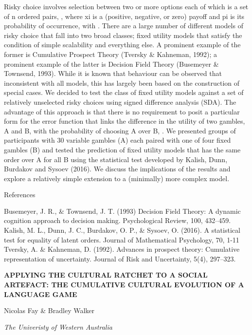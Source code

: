 \documentclass[]{article}
\begin{document}
Risky choice involves selection between two or more options each of
which is a set of n ordered pairs, , where xi is a (positive, negative,
or zero) payoff and pi is its probability of occurrence, with . There
are a large number of different models of risky choice that fall into
two broad classes; fixed utility models that satisfy the condition of
simple scalability and everything else. A prominent example of the
former is Cumulative Prospect Theory (Tversky \& Kahneman, 1992); a
prominent example of the latter is Decision Field Theory (Busemeyer \&
Townsend, 1993). While it is known that behaviour can be observed that
inconsistent with all models, this has largely been based on the
construction of special cases. We decided to test the class of fixed
utility models against a set of relatively unselected risky choices
using signed difference analysis (SDA). The advantage of this approach
is that there is no requirement to posit a particular form for the error
function that links the difference in the utility of two gambles, A and
B, with the probability of choosing A over B, . We presented groups of
participants with 30 variable gambles (A) each paired with one of four
fixed gambles (B) and tested the prediction of fixed utility models that
has the same order over A for all B using the statistical test developed
by Kalish, Dunn, Burdakov and Sysoev (2016). We discuss the implications
of the results and explore a relatively simple extension to a
(minimally) more complex model.

References

Busemeyer, J. R., \& Townsend, J. T. (1993) Decision Field Theory: A
dynamic cognition approach to decision making. Psychological Review,
100, 432--459. Kalish, M. L., Dunn, J. C., Burdakov, O. P., \& Sysoev,
O. (2016). A statistical test for equality of latent orders. Journal of
Mathematical Psychology, 70, 1-11 Tversky, A. \& Kahneman, D. (1992).
Advances in prospect theory: Cumulative representation of uncertainty.
Journal of Risk and Uncertainty, 5(4), 297--323.

\textbf{APPLYING THE CULTURAL RATCHET TO A SOCIAL ARTEFACT: THE
CUMULATIVE CULTURAL EVOLUTION OF A LANGUAGE GAME}

Nicolas Fay \& Bradley Walker

\emph{The Univeristy of Western Australia}
\end{document}
